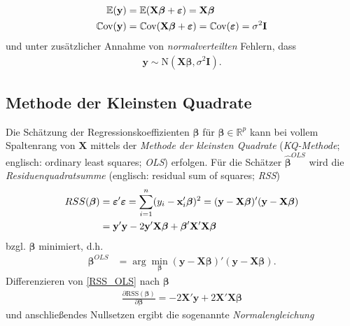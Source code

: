 \documentclass[12pt, a4paper]{report}\usepackage[]{graphicx}\usepackage[]{color}
\begin{document}
\begin{align}
\mathbb{E}(\mathbf{y})&=\mathbb{E}(\mathbf{X} \boldsymbol{\beta}+\boldsymbol{\varepsilon})=\mathbf{X} \boldsymbol{\beta} \notag \\ 
\mathbb{C}\text{ov}(\mathbf{y})&=\mathbb{C}\text{ov}(\mathbf{X} \boldsymbol{\beta}+\boldsymbol{\varepsilon})=\mathbb{C}\text{ov}(\boldsymbol{\varepsilon})=\sigma^2\mathbf{I} \label{Cov_epsilon}
\end{align}
und unter zusätzlicher Annahme von \textit{normalverteilten} Fehlern, dass
\begin{align*}
\mathbf{y} \sim \text{N}(\mathbf{X}\boldsymbol{\beta}, \sigma^2 \mathbf{I}).
\end{align*} 

\subsection{Methode der Kleinsten Quadrate}\label{Kap_Methode der Kleinsten Quadrate}
Die Schätzung der Regressionskoeffizienten $\boldsymbol{\beta}$ für $\boldsymbol{\beta} \in \mathbb{R}^p$ kann bei vollem Spaltenrang von $\mathbf{X}$ mittels der \textit{Methode der kleinsten Quadrate} (\textit{KQ-Methode}; englisch: ordinary least squares; \textit{OLS}) erfolgen. Für die Schätzer $\boldsymbol{\hat{\beta}}^{OLS}$ wird die \textit{Residuenquadratsumme} (englisch: residual sum of squares; \textit{RSS}) 
\begin{align}\label{RSS_OLS}
RSS(\boldsymbol{\beta})&=\boldsymbol{\varepsilon}'\boldsymbol{\varepsilon}=\sum_{i=1}^{n}(y_i - \mathbf{x}_i'\boldsymbol{\beta})^2=(\mathbf{y}-\mathbf{X}\boldsymbol{\beta})'(\mathbf{y}-\mathbf{X}\boldsymbol{\beta}) \notag \\
&=\mathbf{y}'\mathbf{y} -2\mathbf{y}'\mathbf{X}\boldsymbol{\beta}+\boldsymbol{\beta}'\mathbf{X}'\mathbf{X}\boldsymbol{\beta}
\end{align}
bzgl. $\boldsymbol{\beta}$ minimiert, d.h. 
\begin{align}
\boldsymbol{\beta}^{OLS}&=\arg \displaystyle\min_{\boldsymbol{\beta}} (\mathbf{y}-\mathbf{X}\boldsymbol{\beta})'(\mathbf{y}-\mathbf{X}\boldsymbol{\beta}).
\end{align}
Differenzieren von \eqref{RSS_OLS} nach $\boldsymbol{\beta}$
\begin{align}\label{Ableitung_OLS}
\frac{\partial \text{RSS}(\boldsymbol{\beta})}{\partial  \boldsymbol{\beta}} = -2\mathbf{X}'\mathbf{y} + 2\mathbf{X}'\mathbf{X}\boldsymbol{\beta}
\end{align}
und anschließendes Nullsetzen ergibt die sogenannte \textit{Normalengleichung}
\end{document}
